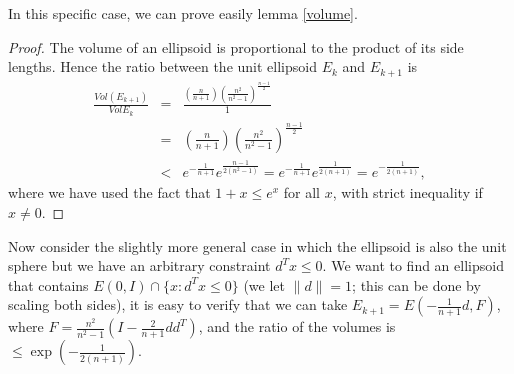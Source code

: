 \documentclass[12pt]{article}
\begin{document}
In this specific case, we can prove easily lemma \ref{volume}.

\begin{proof}
The volume of an ellipsoid is proportional to the product of its side
lengths. Hence the ratio between the unit ellipsoid $E_k$ and
$E_{k+1}$ is 
\begin{eqnarray*}
\frac{Vol(E_{k+1})}{Vol{E_k}}&=&\frac{(\frac{n}{n+1}) 
(\frac{n^2}{n^2-1})^{\frac{n-1}{2}}}{1}\\
&=& \left(\frac{n}{n+1}\right)\left(\frac{n^2}{n^2-1}\right)^{\frac{n-1}{2}} \\
& < & e^{-\frac{1}{n+1}}e^{\frac{n-1}{2(n^2-1)}} = e^{-\frac{1}{n+1}}
e^{\frac{1}{2(n+1)}} = e^{-\frac{1}{2(n+1)}},
\end{eqnarray*}
where we have used the fact that $1+x \leq e^x$ for all $x$, with
strict inequality if $x\neq 0$. 
\end{proof}

Now consider the slightly more general case in which the ellipsoid is
also the unit sphere but we have an arbitrary constraint $d^Tx\leq
0$. We want to find an ellipsoid that contains $E(0, I) \cap \{x :
d^Tx \leq 0\}$ (we let $\|d\| = 1$; this can be done by scaling both
sides), it is easy to verify that we can take
$E_{k+1}=E(-\frac{1}{n+1}d, F)$, where $F = \frac{n^2}{n^2 -
1}(I-\frac{2}{n+1}d d^T)$, and the ratio of the volumes is $\leq
\exp\left(-\frac{1}{2(n+1)}\right)$.
\end{document}
